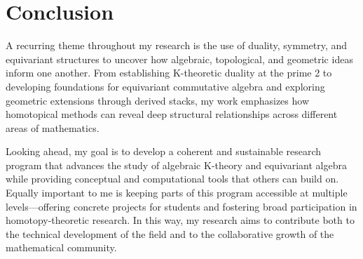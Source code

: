 \documentclass[11pt]{article}
\begin{document}
\section{Conclusion}
A recurring theme throughout my research is the use of duality, symmetry, and equivariant structures to uncover how algebraic, topological, and geometric ideas inform one another. 
From establishing K-theoretic duality at the prime 2 to developing foundations for equivariant commutative algebra and exploring geometric extensions through derived stacks, my work emphasizes how homotopical methods can reveal deep structural relationships across different areas of mathematics.

Looking ahead, my goal is to develop a coherent and sustainable research program that advances the study of algebraic K-theory and equivariant algebra while providing conceptual and computational tools that others can build on. 
Equally important to me is keeping parts of this program accessible at multiple levels—offering concrete projects for students and fostering broad participation in homotopy-theoretic research. 
In this way, my research aims to contribute both to the technical development of the field and to the collaborative growth of the mathematical community.



\end{document}
